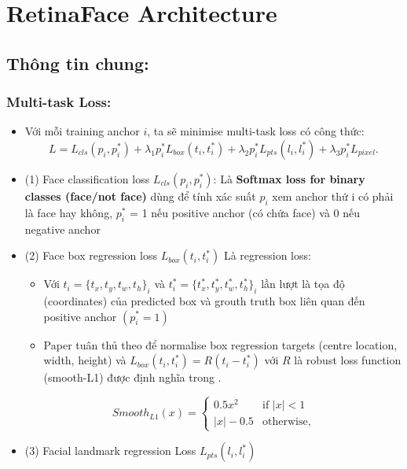 \documentclass[12pt, a4paper, oneside]{book}
\theoremstyle{plain}
\numberwithin{equation}{chapter} \DeclareMathOperator{\Var}{var}
\begin{document}
\chapter{RetinaFace Architecture}
\section{Thông tin chung:}
\subsection{Multi-task Loss:}
\begin{itemize}
    \item[--] Với mỗi training anchor \(i\), ta sẽ minimise multi-task loss có công thức:
    \begin{equation}
    L = L_{cls}(p_i,p_i^*) + \lambda_1p_i^*L_{box}(t_i,t_i^*) + \lambda_2p_i^*L_{pts}(l_i,l_i^*) + \lambda_3p_i^*L_{pixel}. \tag{1}
    \end{equation}
    \item[--](1) Face classification loss \(L_{cls}(p_i,p_i^*)\): Là \textbf{Softmax loss for binary classes (face/not face)} dùng để tính xác suất \(p_i\) xem anchor thứ i có phải là face hay không, \(p_i^*\) = 1 nếu positive anchor (có chứa face) và 0 nếu negative anchor
    \item[--](2) Face box regression loss \(L_{box}(t_i,t_i^*)\) Là regression loss:
    \begin{itemize}
        \item[+] Với \(t_i = \{t_x, t_y, t_w, t_h\}_i\) và \(t_i^* = \{t_x^*, t_y^*, t_w^*, t_h^*\}_i\) lần lượt là tọa độ (coordinates) của predicted box và grouth truth box liên quan đến positive anchor \((p_i^* = 1)\)
        \item[+] Paper tuân thủ theo \cite{girshick2015fast} để normalise box regression targets (centre location, width, height) và \(L_{box}(t_i,t_i^*) = R(t_i - t_i^*)\) với \(R\) là robust loss function (smooth-L1) được định nghĩa trong \cite{girshick2015fast}.
    \end{itemize}
    \begin{equation}
    Smooth_{L1}(x) = 
        \begin{cases}
            0.5x^2  & \text{if } |x| < 1 \\ 
            |x| - 0.5 & \text{otherwise,} 
        \end{cases} \tag{1.1}
    \end{equation}
    \item[--](3) Facial landmark regression Loss \(L_{pts}(l_i,l_i^*)\)

\end{itemize}
\end{document}
